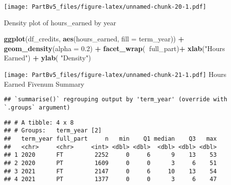 \documentclass[]{article}
\newenvironment{Shaded}{\begin{snugshade}}{\end{snugshade}}
\newcommand{\DataTypeTok}[1]{\textcolor[rgb]{0.13,0.29,0.53}{#1}}
\newcommand{\DecValTok}[1]{\textcolor[rgb]{0.00,0.00,0.81}{#1}}
\newcommand{\FloatTok}[1]{\textcolor[rgb]{0.00,0.00,0.81}{#1}}
\newcommand{\KeywordTok}[1]{\textcolor[rgb]{0.13,0.29,0.53}{\textbf{#1}}}
\newcommand{\NormalTok}[1]{#1}
\newcommand{\OperatorTok}[1]{\textcolor[rgb]{0.81,0.36,0.00}{\textbf{#1}}}
\newcommand{\StringTok}[1]{\textcolor[rgb]{0.31,0.60,0.02}{#1}}
\begin{document}
\texttt{[image: PartBv5\_files/figure-latex/unnamed-chunk-20-1.pdf]}

Density plot of hours\_earned by year

\begin{Shaded}
\begin{Highlighting}[]
\KeywordTok{ggplot}\NormalTok{(df_credits, }\KeywordTok{aes}\NormalTok{(hours_earned, }\DataTypeTok{fill =}\NormalTok{ term_year)) }\OperatorTok{+}\StringTok{ }\KeywordTok{geom_density}\NormalTok{(}\DataTypeTok{alpha =} \FloatTok{0.2}\NormalTok{) }\OperatorTok{+}
\StringTok{  }\KeywordTok{facet_wrap}\NormalTok{(}\OperatorTok{~}\NormalTok{full_part)}\OperatorTok{+}
\StringTok{  }\KeywordTok{xlab}\NormalTok{(}\StringTok{"Hours Earned"}\NormalTok{) }\OperatorTok{+}
\StringTok{  }\KeywordTok{ylab}\NormalTok{( }\StringTok{"Density"}\NormalTok{)}
\end{Highlighting}
\end{Shaded}

\texttt{[image: PartBv5\_files/figure-latex/unnamed-chunk-21-1.pdf]}
Hours Earned Fivenum Summary

\begin{Shaded}
\end{Shaded}

\begin{verbatim}
## `summarise()` regrouping output by 'term_year' (override with `.groups` argument)
\end{verbatim}

\begin{verbatim}
## # A tibble: 4 x 8
## # Groups:   term_year [2]
##   term_year full_part     n   min    Q1 median    Q3   max
##   <chr>     <chr>     <int> <dbl> <dbl>  <dbl> <dbl> <dbl>
## 1 2020      FT         2252     0     6      9    13    53
## 2 2020      PT         1609     0     0      3     6    51
## 3 2021      FT         2147     0     6     10    13    54
## 4 2021      PT         1377     0     0      3     6    47
\end{verbatim}
\end{document}
